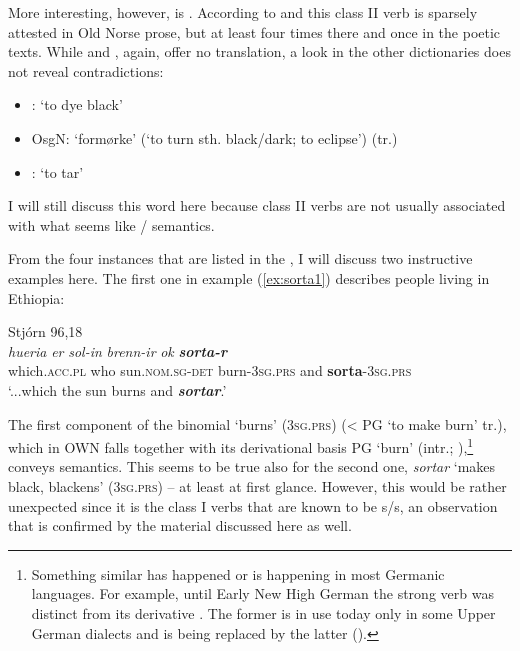 \documentclass[output=paper,colorlinks,citecolor=brown]{langscibook}
\begin{document}
More interesting, however, is . According to  and  this class II verb is sparsely attested in Old Norse prose, but at least four times there and once in the poetic texts. While  and , again, offer no translation, a look in the other dictionaries does not reveal contradictions:

\begin{itemize}
\item {}: ‘to dye black’
\item OsgN: ‘formørke’ (‘to turn sth. black/dark; to eclipse’) (tr.)
\item {}: ‘to tar’
\end{itemize}

I will still discuss this word here because class II verbs are not usually associated with what seems like / semantics.

From the four instances that are listed in the , I will discuss two instructive examples here. The first one in example (\ref{ex:sorta1}) describes people living in Ethiopia:
 
\begin{exe}
    \ex Stjórn 96,18 \label{ex:sorta1}\\
     \textit{hueria} \textit{er} \textit{sol-in} \textit{brenn-ir} \textit{ok} {\textit{\textbf{sorta-r}} }\\
     {}  which.\textsc{acc.pl} who sun.\textsc{nom.sg-det} burn-\textsc{3sg.prs} and \textbf{sorta}-\textsc{3sg.prs}\\
    \glt ‘...which the sun burns and \textbf{\textit{sortar}}.’
\end{exe} 

The first component of the binomial  ‘burns’ (\textsc{3sg.prs}) (< PG  ‘to make burn’ tr.), which in OWN falls together with its derivational basis PG  ‘burn’ (intr.; ),\footnote{Something similar has happened or is happening in most Germanic languages. For example, until Early New High German the strong verb  was distinct from its derivative . The former is in use today only in some Upper German dialects and is being replaced by the latter ().} conveys  semantics. This seems to be true also for the second one, \textit{sortar}  ‘makes black, blackens’ (\textsc{3sg.prs}) – at least at first glance. However, this would be rather unexpected since it is the class I verbs that are known to be s/s, an observation that is confirmed by the material discussed here as well.
\end{document}
